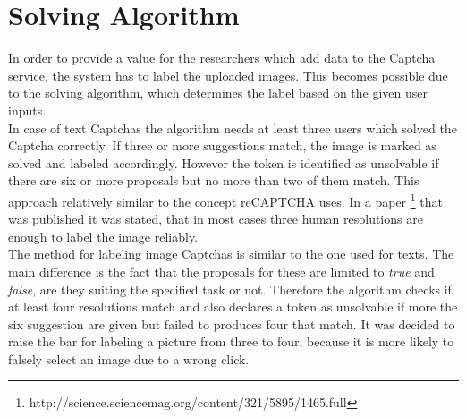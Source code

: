 \section{Solving Algorithm}
\label{sec:solving_algorithm}

In order to provide a value for the researchers which add data to the Captcha service, the system has to label the uploaded images. This becomes possible due to the solving algorithm, which determines the label based on the given user inputs. \\
In case of text Captchas the algorithm needs at least three users which solved the Captcha correctly. If three or more suggestions match, the image is marked as solved and labeled accordingly. However the token is identified as unsolvable if there are six or more proposals but no more than two of them match. This approach relatively similar to the concept reCAPTCHA uses. In a paper \footnote{http://science.sciencemag.org/content/321/5895/1465.full} that was published it was stated, that in most cases three human resolutions are enough to label the image reliably. \\
The method for labeling image Captchas is similar to the one used for texts. The main difference is the fact that the proposals for these are limited to \textit{true} and \textit{false}, are they suiting the specified task or not. Therefore the algorithm checks if at least four resolutions match and also declares a token as unsolvable if more the six suggestion are given but failed to produces four that match. It was decided to raise the bar for labeling a picture from three to four, because it is more likely to falsely select an image due to a wrong click.

\clearpage